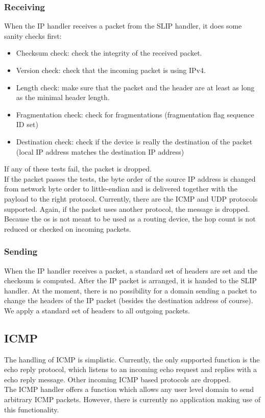 \subsubsection{Receiving}
When the IP handler receives a packet from the SLIP handler, it does some sanity checks first:
\begin{itemize}
	\item Checksum check: check the integrity of the received packet.
	\item Version check: check that the incoming packet is using IPv4.
	\item Length check: make sure that the packet and the header are at least as long as the minimal header length.
	\item Fragmentation check: check for fragmentations (fragmentation flag sequence ID set)
	\item Destination check: check if the device is really the destination of the packet (local IP address matches the destination IP address)
\end{itemize}
If any of these tests fail, the packet is dropped.\\
If the packet passes the tests, the byte order of the source IP address is changed from network byte order to little-endian and is delivered together with the payload to the right protocol. Currently, there are the ICMP and UDP protocols supported. Again, if the packet uses another protocol, the message is dropped.\\
Because the os is not meant to be used as a routing device, the hop count is not reduced or checked on incoming packets.

\subsubsection{Sending}
When the IP handler receives a packet, a standard set of headers are set and the checksum is computed. After the IP packet is arranged, it is handed to the SLIP handler. At the moment, there is no possibility for a domain sending a packet to change the headers of the IP packet (besides the destination address of course). We apply a standard set of headers to all outgoing packets. 

\subsection{ICMP}
The handling of ICMP is simplistic. Currently, the only supported function is the echo reply protocol, which listens to an incoming echo request and replies with a echo reply message. Other incoming ICMP based protocols are dropped.\\
The ICMP handler offers a function which allows any user level domain to send arbitrary ICMP packets. However, there is currently no application making use of this functionality.
\\

